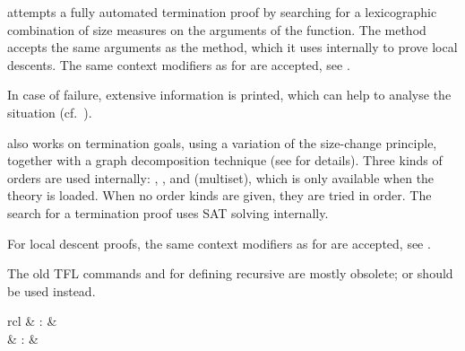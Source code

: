 \begin{isabellebody}
\begin{isamarkuptext}
\begin{description}
  \item \hyperlink{method.HOL.lexicographic-order}{\mbox{}} attempts a fully
  automated termination proof by searching for a lexicographic
  combination of size measures on the arguments of the function. The
  method accepts the same arguments as the \hyperlink{method.auto}{\mbox{}} method,
  which it uses internally to prove local descents.  The same context
  modifiers as for \hyperlink{method.auto}{\mbox{}} are accepted, see
  .

  In case of failure, extensive information is printed, which can help
  to analyse the situation (cf.\ \cite{isabelle-function}).

  \item \hyperlink{method.HOL.size-change}{\mbox{}} also works on termination goals,
  using a variation of the size-change principle, together with a
  graph decomposition technique (see \cite{krauss_phd} for details).
  Three kinds of orders are used internally: , ,
  and  (multiset), which is only available when the theory
   is loaded. When no order kinds are given, they are
  tried in order. The search for a termination proof uses SAT solving
  internally.

 For local descent proofs, the same context modifiers as for \hyperlink{method.auto}{\mbox{}} are accepted, see .

  \end{description}%
\end{isamarkuptext}%
\isamarkuptrue%
%
\isamarkuptrue%
%
\begin{isamarkuptext}%
The old TFL commands \hyperlink{command.HOL.recdef}{\mbox{}} and \hyperlink{command.HOL.recdef-tc}{\mbox{}} for defining recursive are mostly obsolete; \hyperlink{command.HOL.function}{\mbox{}} or \hyperlink{command.HOL.fun}{\mbox{}} should be used instead.

  \begin{matharray}{rcl}
    \hypertarget{command.HOL.recdef}{\hyperlink{command.HOL.recdef}{\mbox{}}} & : &  \\
    \hypertarget{command.HOL.recdef-tc}{\hyperlink{command.HOL.recdef-tc}{\mbox{}}}\isa{{\isachardoublequote}\isactrlsup {\isacharasterisk}{\isachardoublequote}} & : &  \\
  \end{matharray}


\end{isamarkuptext}
\end{isabellebody}
